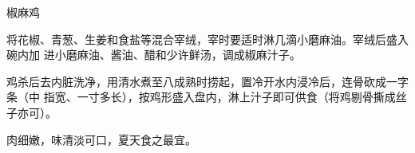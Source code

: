 \begin{recipe}{椒麻鸡}

\ingredients


\preparation

将花椒、青葱、生姜和食盐等混合宰绒，宰时要适时淋几滴小磨麻油。宰绒后盛入碗内加
进小磨麻油、酱油、醋和少许鲜汤，调成椒麻汁子。

鸡杀后去内脏洗净，用清水煮至八成熟时捞起，置冷开水内浸冷后，连骨砍成一字条（中
指宽、一寸多长），按鸡形盛入盘内，淋上汁子即可供食（将鸡剔骨撕成丝子亦可）。

\features

肉细嫩，味清淡可口，夏天食之最宜。

\end{recipe}

